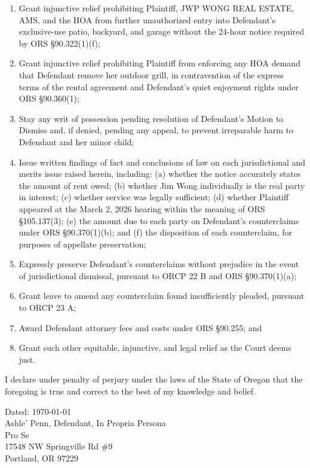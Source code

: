 \documentclass[12pt,letterpaper]{article}
\newcommand{\signatureblock}[1]{%
\vspace{0.5in}
\noindent Dated: \today \\
\vspace{1in}
#1 \\
Pro Se \\
17548 NW Springville Rd \#9 \\
Portland, OR 97229 \\
}
\begin{document}
\begin{enumerate}
  \item Grant injunctive relief prohibiting Plaintiff, JWP WONG REAL ESTATE, AMS, and the HOA from further unauthorized entry into Defendant's exclusive-use patio, backyard, and garage without the 24-hour notice required by ORS \S90.322(1)(f);

  \item Grant injunctive relief prohibiting Plaintiff from enforcing any HOA demand that Defendant remove her outdoor grill, in contravention of the express terms of the rental agreement and Defendant's quiet enjoyment rights under ORS \S90.360(1);

  \item Stay any writ of possession pending resolution of Defendant's Motion to Dismiss and, if denied, pending any appeal, to prevent irreparable harm to Defendant and her minor child;

  \item Issue written findings of fact and conclusions of law on each jurisdictional and merits issue raised herein, including: (a) whether the notice accurately states the amount of rent owed; (b) whether Jim Wong individually is the real party in interest; (c) whether service was legally sufficient; (d) whether Plaintiff appeared at the March 2, 2026 hearing within the meaning of ORS \S105.137(3); (e) the amount due to each party on Defendant's counterclaims under ORS \S90.370(1)(b); and (f) the disposition of each counterclaim, for purposes of appellate preservation;

  \item Expressly preserve Defendant's counterclaims without prejudice in the event of jurisdictional dismissal, pursuant to ORCP 22 B and ORS \S90.370(1)(a);

  \item Grant leave to amend any counterclaim found insufficiently pleaded, pursuant to ORCP 23 A;

  \item Award Defendant attorney fees and costs under ORS \S90.255; and

  \item Grant such other equitable, injunctive, and legal relief as the Court deems just.
\end{enumerate}

I declare under penalty of perjury under the laws of the State of Oregon that the foregoing is true and correct to the best of my knowledge and belief.

\signatureblock{Ashle' Penn, Defendant, In Propria Persona}
\end{document}
